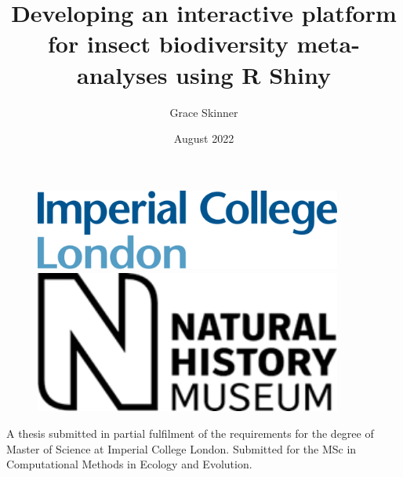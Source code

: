 \documentclass[11pt]{article}
\title{\huge Developing an interactive platform for insect biodiversity meta-analyses using R Shiny}
\author{\huge Grace Skinner}
\date{\huge August 2022}
\begin{document}
	
	\begin{figure}
		\centering
		\begin{minipage}{0.45\textwidth}
			\centering
			\includegraphics[width=0.9\textwidth]{imperial_logo.png} %
		\end{minipage}\hfill
		\begin{minipage}{0.45\textwidth}
			\centering
			\includegraphics[width=0.9\textwidth]{nhm_logo.png} %
		\end{minipage}
	\end{figure}

	\maketitle
	\vspace*{\fill} %
	\noindent \begin{center} A thesis submitted in partial fulfilment of the requirements for the degree of Master of Science at Imperial College London. Submitted for the MSc in Computational Methods in Ecology and Evolution. \end{center}
	
	\clearpage
	
	
	\tableofcontents
	
	
	\clearpage
	
	\linenumbers %
	
\end{document}
